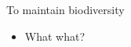 \begin{frame}{To maintain biodiversity}
    \begin{itemize}
        \item What what?
    \end{itemize}
\end{frame}
